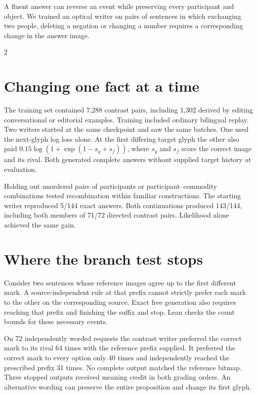 \newpage
{}
\noindent A fluent answer can reverse an event while preserving every participant and object. We trained an optical writer on pairs of sentences in which exchanging two people, deleting a negation or changing a number requires a corresponding change in the answer image.
\begin{multicols}{2}
\section*{Changing one fact at a time}
The training set contained 7,288 contrast pairs, including 1,302 derived by editing conversational or editorial examples. Training included ordinary bilingual replay. Two writers started at the same checkpoint and saw the same batches. One used the next-glyph log loss alone. At the first differing target glyph the other also paid $0.15\log(1+\exp(1-s_g+s_f))$, where $s_g$ and $s_f$ score the correct image and its rival. Both generated complete answers without supplied target history at evaluation.
\par Holding out unordered pairs of participants or participant--commodity combinations tested recombination within familiar constructions. The starting writer reproduced 5/144 exact answers. Both continuations produced 143/144, including both members of 71/72 directed contrast pairs. Likelihood alone achieved the same gain.
\section*{Where the branch test stops}
Consider two sentences whose reference images agree up to the first different mark. A source-independent rule at that prefix cannot strictly prefer each mark to the other on the corresponding source. Exact free generation also requires reaching that prefix and finishing the suffix and stop. Lean checks the count bounds for these necessary events.
\par On 72 independently worded requests the contrast writer preferred the correct mark to its rival 64 times with the reference prefix supplied. It preferred the correct mark to every option only 40 times and independently reached the prescribed prefix 31 times. No complete output matched the reference bitmap. Three stopped outputs received meaning credit in both grading orders. An alternative wording can preserve the entire proposition and change its first glyph.
\end{multicols}
